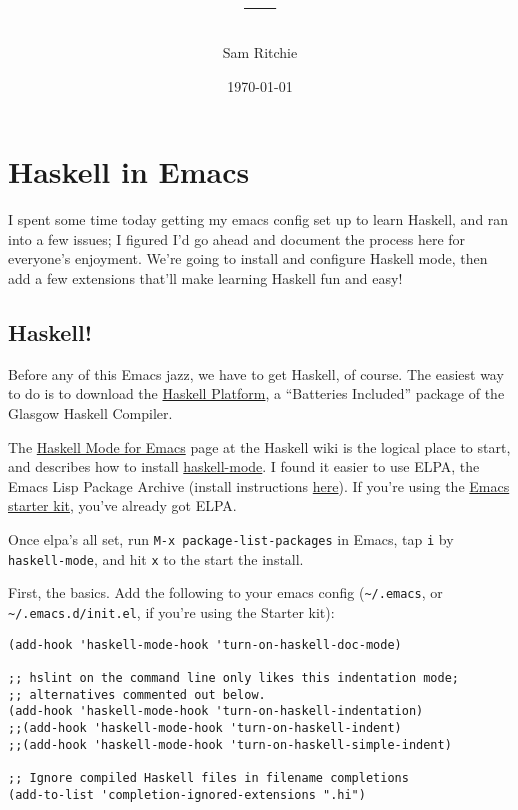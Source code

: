 \documentclass[11pt]{article}
\title{---}
\author{Sam Ritchie}
\date{\today}
\begin{document}
\maketitle

\setcounter{tocdepth}{3}
\tableofcontents
\vspace*{1cm}

\section{Haskell in Emacs}
\label{sec-1}


I spent some time today getting my emacs config set up to learn Haskell, and ran into a few issues; I figured I'd go ahead and document the process here for everyone's enjoyment. We're going to install and configure Haskell mode, then add a few extensions that'll make learning Haskell fun and easy!
\subsection{Haskell!}
\label{sec-1-1}


Before any of this Emacs jazz, we have to get Haskell, of course. The easiest way to do is to download the \href{http://hackage.haskell.org/platform/}{Haskell Platform}, a ``Batteries Included'' package of the Glasgow Haskell Compiler.


The \href{http://www.haskell.org/haskellwiki/Haskell_mode_for_Emacs}{Haskell Mode for Emacs} page at the Haskell wiki is the logical place to start, and describes how to install \href{http://projects.haskell.org/haskellmode-emacs/}{haskell-mode}. I found it easier to use ELPA, the Emacs Lisp Package Archive (install instructions \href{http://tromey.com/elpa/install.html}{here}). If you're using the \href{https://github.com/technomancy/emacs-starter-kit}{Emacs starter kit}, you've already got ELPA.

Once elpa's all set, run \texttt{M-x package-list-packages} in Emacs, tap \texttt{i} by \texttt{haskell-mode}, and hit \texttt{x} to the start the install.


First, the basics. Add the following to your emacs config (\texttt{\textasciitilde{}/.emacs}, or \texttt{\textasciitilde{}/.emacs.d/init.el}, if you're using the Starter kit):


\begin{verbatim}
(add-hook 'haskell-mode-hook 'turn-on-haskell-doc-mode)

;; hslint on the command line only likes this indentation mode;
;; alternatives commented out below.
(add-hook 'haskell-mode-hook 'turn-on-haskell-indentation)
;;(add-hook 'haskell-mode-hook 'turn-on-haskell-indent)
;;(add-hook 'haskell-mode-hook 'turn-on-haskell-simple-indent)

;; Ignore compiled Haskell files in filename completions
(add-to-list 'completion-ignored-extensions ".hi")
\end{verbatim}
\end{document}
